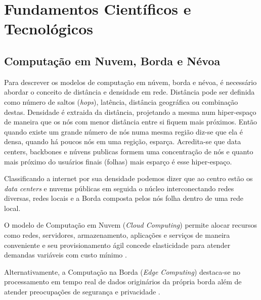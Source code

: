 \chapter{Fundamentos Científicos e Tecnológicos}


\section{Computação em Nuvem, Borda e Névoa}

Para descrever os modelos de computação em núvem, borda e névoa, é necessário
abordar o conceito de distância e densidade em rede. Distância pode ser definida
como número de saltos (\emph{hops}), latência, distância geográfica ou combinação destas.
Densidade é extraida da distância, projetando a mesma num hiper-espaço de maneira que os
nós com menor distância entre si fiquem mais próximos. Então quando existe um
grande número de nós numa mesma região diz-se que ela é densa, quando há poucos
nós em uma regição, esparça. Acredita-se que data centers, backbones e núvens publicas
formem uma concentração de nós e quanto mais próximo do usuários finais (folhas)
mais esparço é esse hiper-espaço.

Classificando a internet por sua densidade podemos dizer que ao centro estão
os \emph{data centers} e nuvems públicas em seguida o núcleo interconectando redes diversas,
redes locais e a Borda composta pelos nós folha dentro de uma rede local.

O modelo de Computação em Nuvem (\emph{Cloud Computing})
permite alocar recursos como redes, servidores, armazenamento, aplicações e serviços
de maneira conveniente e seu provisionamento ágil concede elasticidade para atender
demandas variáveis com custo mínimo \cite{NIST2011}.

Alternativamente, a Computação na Borda (\emph{Edge Computing}) destaca-se no
processamento em tempo real de dados originários da própria borda além de atender
preocupações de segurança e privacidade \cite{Shi2016}.

